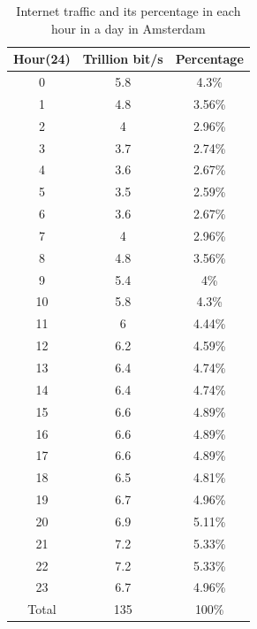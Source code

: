 \begin{table}[hbt!]
    \centering
    \begin{tabular}{|c|c|c|}
        \hline
         Hour(24) & Trillion bit/s & Percentage\\
        \hline
        0 & 5.8 & 4.3\% \\
        \hline
        1 & 4.8 & 3.56\% \\
        \hline
        2 & 4 & 2.96\% \\
        \hline
        3 & 3.7 & 2.74\% \\
        \hline
        4 & 3.6 & 2.67\% \\
        \hline
        5 & 3.5 & 2.59\% \\
        \hline
        6 & 3.6 & 2.67\%  \\
        \hline
        7 & 4 & 2.96\%  \\
        \hline
        8 & 4.8 & 3.56\%  \\
        \hline
        9 & 5.4 & 4\%  \\
        \hline
        10 & 5.8 & 4.3\%  \\
        \hline
        11 & 6 & 4.44\% \\
        \hline
        12 & 6.2 & 4.59\%  \\
        \hline
        13 & 6.4 & 4.74\%  \\
        \hline
        14 & 6.4 & 4.74\%  \\
        \hline
        15 & 6.6 & 4.89\%  \\
        \hline
        16 & 6.6 & 4.89\%  \\
        \hline
        17 & 6.6 & 4.89\%  \\
        \hline
        18 & 6.5 & 4.81\%  \\
        \hline
        19 & 6.7 & 4.96\%  \\
        \hline
        20 & 6.9 & 5.11\%  \\
        \hline
        21 & 7.2 & 5.33\%  \\
        \hline
        22 & 7.2 & 5.33\%  \\
        \hline
        23 & 6.7 & 4.96\% \\
        \hline
        Total & 135 & 100\%  \\
        \hline
    \end{tabular}
    \caption{Internet traffic and its percentage in each hour in a day in Amsterdam \cite{Amsterdam_internet_traffic}}
    \label{tab:table_amsterdam}
\end{table}

